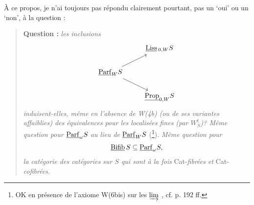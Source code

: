 À ce propos, je n'ai toujours pas répondu clairement pourtant, pas un ‘oui’ ou un ‘non’, à la question :

\begin{quote}
\textbf{Question :} \textit{les inclusions}
\[
\begin{tikzcd}
 & \Liss_{0,W}S \\
\Parf_W S \arrow[ur] \arrow[dr] & \\
 & \Prop_{0,W}S
\end{tikzcd}
\]
\textit{induisent-elles, même en l'absence de W(4b) (ou de ses variantes affaiblies) des équivalences pour les localisées fines (par $W^{\mathrm{f}}_S$)? Même question pour} $\underline{\mathrm{Parf}}_\omega S$ \textit{au lieu de} $\underline{\mathrm{Parf}}_W S$ (\footnote{OK en présence de l'axiome W(6bis) sur les $\varinjlim$ , cf. p. 192 ff.}). \textit{Même question pour}
\[ \underline{\mathrm{Bifib}}\, S \subseteq \underline{\mathrm{Parf}}_\omega S, \]
\textit{la catégorie des catégories sur $S$ qui sont à la fois} Cat-\textit{fibrées et} Cat-\textit{cofibrées.}
\end{quote}

